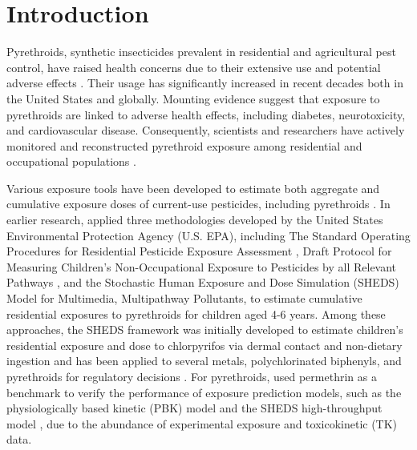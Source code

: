 \documentclass[toxics,article,submit,pdftex,moreauthors]{Definitions/mdpi}
\begin{document}
\section{Introduction}\label{introduction}

Pyrethroids, synthetic insecticides prevalent in residential and
agricultural pest control, have raised health concerns due to their extensive
use and potential adverse effects \citep{burns2018pyrethroid}. Their usage has
significantly increased in recent decades both in the United States and
globally. Mounting evidence suggest that exposure to pyrethroids are linked to
adverse health effects, including diabetes, neurotoxicity, and cardiovascular
disease. Consequently, scientists and researchers have actively monitored and
reconstructed pyrethroid exposure among residential and occupational
populations \citep{zartarian2012quantifying, bravo2022occupational}.

Various exposure tools have been developed to estimate both aggregate
and cumulative exposure doses of current-use pesticides, including
pyrethroids
\citep{tulve2011methodologies, zartarian2012quantifying, xue2014epa}. In
earlier research, \citet{tulve2011methodologies} applied three methodologies
developed by the United States Environmental Protection Agency (U.S. EPA),
including The Standard Operating Procedures for Residential Pesticide Exposure
Assessment \citep{us2012standard}, Draft Protocol for Measuring Children's
Non-Occupational Exposure to Pesticides by all Relevant Pathways
\citep{us2001draft}, and the Stochastic Human Exposure and Dose Simulation
(SHEDS) Model for Multimedia, Multipathway Pollutants, to estimate cumulative
residential exposures to pyrethroids for children aged 4-6 years. Among these
approaches, the SHEDS framework was initially developed to estimate children's
residential exposure and dose to chlorpyrifos via dermal contact and
non-dietary ingestion \citep{zartarian2000modeling} and has been applied to
several metals, polychlorinated biphenyls, and pyrethroids for regulatory
decisions \citep{tulve2011methodologies, xue2015modeling,
zartarian2017children}. For pyrethroids, \citet{zartarian2012quantifying} used
permethrin as a benchmark to verify the performance of exposure prediction
models, such as the physiologically based kinetic (PBK) model
\citep{tornero2012pharmacokinetic} and the SHEDS high-throughput model
\citep{isaacs2014sheds}, due to the abundance of experimental exposure and
toxicokinetic (TK) data.
\end{document}
